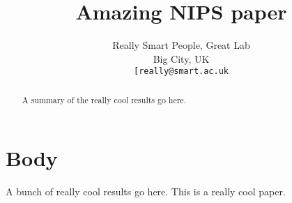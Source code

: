 \documentclass{article}
\title{Amazing NIPS paper}
\author{
  Really Smart People,
  Great Lab\\
  Big City, UK \\
  \texttt{[really@smart.ac.uk} \\
}
\begin{document}
\maketitle
\begin{abstract}
A summary of the really cool results go here.
\end{abstract}

\section{Body}
A bunch of really cool results go here. This \cite{olshausen_emergence_1996} is a really cool paper.

\clearpage
\pagebreak

\end{document}
